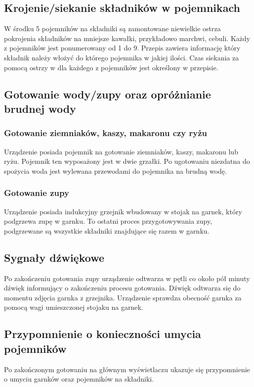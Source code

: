 \documentclass[12pt,a4paper,notitlepage]{article}
\begin{document}
\subsection{Krojenie/siekanie składników w pojemnikach}
W środku 5 pojemników na składniki są zamontowane niewielkie ostrza pokrojenia składników na mniejsze kawałki, przykładowo marchwi, cebuli. Każdy z pojemników jest ponumerowany od 1 do 9. Przepis zawiera informację który składnik należy włożyć do którego pojemnika w jakiej ilości. Czas siekania za pomocą ostrzy w dla każdego z pojemników jest określony w przepisie.

\subsection{Gotowanie wody/zupy oraz opróżnianie brudnej wody}
\subsubsection{Gotowanie ziemniaków, kaszy, makaronu czy ryżu}
Urządzenie posiada pojemnik na gotowanie ziemniaków, kaszy, makaronu lub ryżu. Pojemnik ten wyposażony jest w dwie grzałki. Po ugotowaniu niezdatna do spożycia woda jest wylewana przewodami do pojemnika na brudną wodę.

\subsubsection{Gotowanie zupy}
Urządzenie posiada indukcyjny grzejnik wbudowany w stojak na garnek, który podgrzewa zupę w garnku. To ostatni proces przygotowywania zupy, podgrzewane są wszystkie składniki znajdujące się razem w garnku.

\subsection{Sygnały dźwiękowe}
Po zakończeniu gotowania zupy urządzenie odtwarza w pętli co około pół minuty dźwięk informujący o zakończeniu procesu gotowania. Dźwięk odtwarza się do momentu zdjęcia garnka z grzejnika. Urządzenie sprawdza obecność garnka za pomocą wagi umieszczonej stojaku na garnek.

\subsection{Przypomnienie o konieczności umycia pojemników}
Po zakończonym gotowaniu na głównym wyświetlaczu ukazuje się przypomnienie o umyciu garnków oraz pojemników na składniki.
\end{document}
